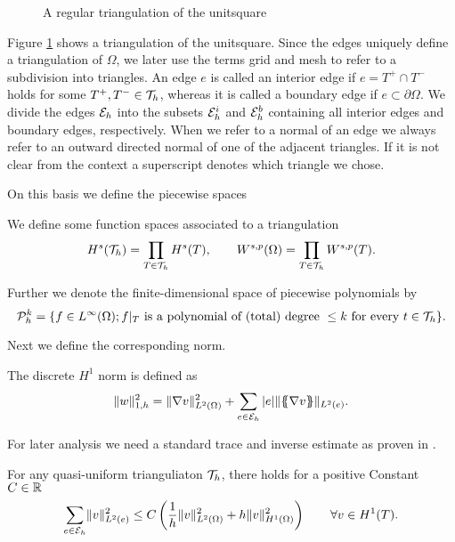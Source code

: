 \begin{definition} 
\begin{figure}[H]

\caption{A regular triangulation of the unitsquare}
 \label{fig: triangulation}
\end{figure}

Figure \ref{fig: triangulation} shows a triangulation of the unitsquare. Since the edges uniquely define a triangulation of $\Omega$, we later use the terms grid and mesh to refer to a subdivision into triangles.
An edge $e$ is called an interior edge if $e=T^+ \cap T^-$ holds for some $T^+,T^- \in \mathcal{T}_h$, whereas it is called a boundary edge if $e \subset \partial \Omega$.
We divide the edges $\mathcal{E}_h$ into the subsets $\mathcal{E}_h^i$ and $\mathcal{E}_h^b$ containing all interior edges and boundary edges, respectively. 
When we refer to a normal of an edge we always refer to an outward directed normal of one of the adjacent triangles. If it is not clear from the context a superscript denotes which triangle we chose.

On this basis we define the piecewise spaces
\begin{definition}
We define some function spaces associated to a triangulation
\begin{align}
	H^s(\mathcal{T}_h) = \prod\limits_{T\in \mathcal{T}_h}  H^s(T), \qquad W^{s,p}(\Omega) = \prod\limits_{T\in \mathcal{T}_h} W^{s,p}(T).
\end{align}	
\end{definition}

\begin{definition} \label{def: piecewise polySpace}
	Further we denote the finite-dimensional space of piecewise polynomials by
\[	
	\mathcal P^k_h = \{ f \in L^\infty(\Omega); f \arrowvert_T \textnormal{ is a polynomial of (total) degree } \leq k \textnormal{ for every } t \in \mathcal T_h\}.
\]
\end{definition}
Next we define the corresponding norm.
\begin{definition} \label{def: discrete h1 norm}
	The discrete $H^1$ norm is defined as 
\[	
		\lVert w \rVert_{1,h} ^2 = \lVert \nabla v  \rVert_{L^2(\Omega)}^2 + \sum_{e \in \mathcal{E}_h} |e| \lVert \{\!\!\{ \nabla v  \}\!\!\} \rVert_{L^2(e)}.
\]
\end{definition}

For later analysis we need a standard trace and inverse estimate as proven in \cite[Section 1.6 and Section 4.5]{BS2002}.
\begin{lemma}\label{la: trace estimate}
	For any quasi-uniform trianguliaton $\mathcal{T}_h$, there holds for a positive Constant $C\in \mathbb{R}$
	\[
	\sum_{e \in \mathcal{E}_h} \lVert v \rVert_{L^2(e)}^2 \leq C\left(\frac 1 {h} \lVert v \rVert_{L^2(\Omega)}^2  + h \lVert v \rVert_{H^1(\Omega)}^2\right) \qquad \forall v \in H^1(T).
	\]
\end{lemma}


\end{definition}
